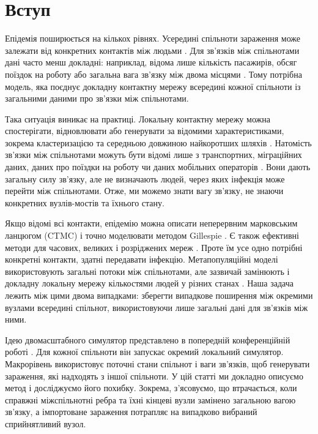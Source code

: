 \documentclass[a4paper,fleqn]{cas-sc}
\begin{document}
\section{Вступ}
\label{sec:introduction}

Епідемія поширюється на кількох рівнях. Усередині спільноти зараження може залежати від конкретних контактів між людьми \citep{keeling2005,pastorsatorras2015,kiss2017}. Для зв'язків між спільнотами дані часто менш докладні: наприклад, відома лише кількість пасажирів, обсяг поїздок на роботу або загальна вага зв'язку між двома місцями \citep{balcan2009,barbosa2018human}. Тому потрібна модель, яка поєднує докладну контактну мережу всередині кожної спільноти із загальними даними про зв'язки між спільнотами.

Така ситуація виникає на практиці. Локальну контактну мережу можна спостерігати, відновлювати або генерувати за відомими характеристиками, зокрема кластеризацією та середньою довжиною найкоротших шляхів \citep{eubank2004,danon2011}. Натомість зв'язки між спільнотами можуть бути відомі лише з транспортних, міграційних даних, даних про поїздки на роботу чи даних мобільних операторів \citep{barbosa2018human,chang2021}. Вони дають загальну силу зв'язку, але не визначають людей, через яких інфекція може перейти між спільнотами. Отже, ми можемо знати вагу зв'язку, не знаючи конкретних вузлів-мостів та їхнього стану.

Якщо відомі всі контакти, епідемію можна описати неперервним марковським ланцюгом (CTMC) і точно моделювати методом Gillespie \citep{gillespie1977exact,gibson2000}. Є також ефективні методи для часових, великих і розріджених мереж \citep{vestergaard2015,kuryliak2025simulating}. Проте їм усе одно потрібні конкретні контакти, здатні передавати інфекцію. Метапопуляційні моделі використовують загальні потоки між спільнотами, але зазвичай замінюють і докладну локальну мережу кількостями людей у різних станах \citep{colizza2007reaction,colizza2008,balcan2010modeling,ajelli2010}. Наша задача лежить між цими двома випадками: зберегти випадкове поширення між окремими вузлами всередині спільнот, використовуючи лише загальні дані для зв'язків між ними.

Ідею двомасштабного симулятор представлено в попередній конференційній роботі \citep{kuryliak2025towards}. Для кожної спільноти він запускає окремий локальний симулятор. Макрорівень використовує поточні стани спільнот і ваги зв'язків, щоб генерувати зараження, які надходять з іншої спільноти. У цій статті ми докладно описуємо метод і досліджуємо його похибку. Зокрема, з'ясовуємо, що втрачається, коли справжні міжспільнотні ребра та їхні кінцеві вузли замінено загальною вагою зв'язку, а імпортоване зараження потрапляє на випадково вибраний сприйнятливий вузол.
\end{document}
